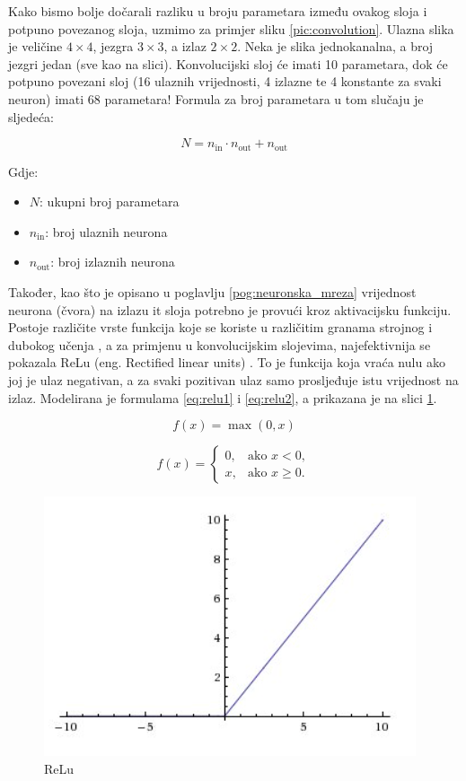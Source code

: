 Kako bismo bolje dočarali razliku u broju parametara između ovakog sloja i potpuno povezanog sloja,
uzmimo za primjer sliku \ref{pic:convolution}. Ulazna slika je veličine \(4 \times 4\),
jezgra \(3 \times 3\), a izlaz 
\(2 \times 2\). Neka je slika jednokanalna, a broj jezgri jedan (sve kao na slici). Konvolucijski sloj
će imati 10 parametara, dok će potpuno povezani sloj (16 ulaznih vrijednosti, 4 izlazne te
4 konstante za svaki neuron) imati 68 parametara! Formula za broj parametara u tom slučaju
je sljedeća:

\begin{equation}
    N = n_{\text{in}} \cdot n_{\text{out}} + n_{\text{out}}
\end{equation}

Gdje:
\begin{itemize}
    \item \(N\): ukupni broj parametara
    \item \(n_{\text{in}}\): broj ulaznih neurona
    \item \(n_{\text{out}}\): broj izlaznih neurona
\end{itemize}

Također, kao što je opisano u poglavlju \ref{pog:neuronska_mreza} vrijednost neurona (čvora) na
izlazu it sloja potrebno je provući kroz aktivacijsku funkciju. Postoje različite vrste funkcija
koje se koriste u različitim granama strojnog i dubokog učenja \cite{activation_fcn}, a za
primjenu u konvolucijskim slojevima, najefektivnija se pokazala ReLu (eng. Rectified linear units)
\cite{relu}. To je funkcija koja vraća nulu ako joj je ulaz negativan, a za svaki pozitivan
ulaz samo prosljeđuje istu vrijednost na izlaz. Modelirana je formulama \ref{eq:relu1} i 
\ref{eq:relu2}, a prikazana je na slici \ref{pic:relu}. 

\begin{equation}
    f(x) = \max(0, x)
    \label{eq:relu1}
\end{equation}

\begin{equation}
    f(x) = 
    \begin{cases} 
        0, & \text{ako } x < 0, \\
        x, & \text{ako } x \geq 0.
    \end{cases}
    \label{eq:relu2}
\end{equation}

\begin{figure}[htb]
    \centering
    \includegraphics[width=0.5\linewidth]{Chapters/neuronska_mreza/CNN/relu.png} 
    \caption{ReLu \cite{relu}}
    \label{pic:relu}
\end{figure}

